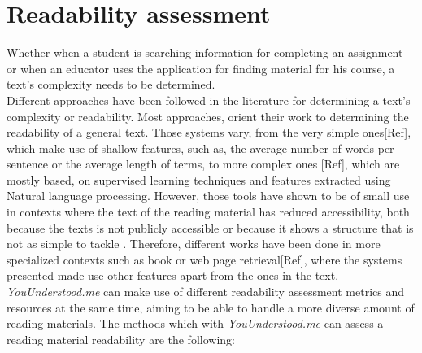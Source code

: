 \documentclass{sig-alternate-05-2015}
\begin{document}
 

\section{Readability assessment}
Whether when a student is searching information for completing an assignment or when an educator uses the application for finding material for his course, a text's complexity needs to be determined.\\




Different approaches have been followed in the literature for determining a text's complexity or readability. Most approaches, orient their work to determining the readability of a general text. Those systems vary, from the very simple ones[Ref], which make use of shallow features, such as, the average number of words per sentence or the average length of terms, to more complex ones [Ref], which are mostly based, on supervised learning techniques and features extracted using Natural language processing. However, those tools have shown to be of small use in contexts where the text of the reading material has reduced accessibility, both because the texts is not publicly accessible or because it shows a structure that is not as simple to tackle . Therefore, different works have been done in more specialized contexts such as book\cite{denning2015readability} or web page retrieval[Ref], where the systems presented made use other features apart from the ones in the text.\\


\textit{YouUnderstood.me} can make use of different readability assessment metrics and resources at the same time, aiming to be able to handle a more diverse amount of reading materials. The methods  which with \textit{YouUnderstood.me} can assess a reading material readability are the following:
\end{document}
